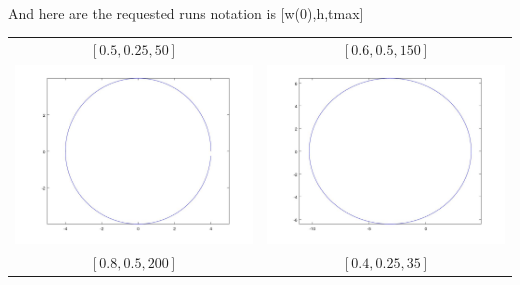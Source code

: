 \documentclass[12pt]{article}
\theoremstyle{homework}
\begin{document}
\begin{enumerate}[(a)]
\begin{tabular}{c c}
\end{tabular}\\
And here are the requested runs notation is [w(0),h,tmax]\\
\begin{tabular}{c c}
$[0.5,0.25,50]$ & $[0.6,0.5,150]$\\
\includegraphics[scale=.3]{../octave/f4.jpg} & \includegraphics[scale=.3]{../octave/f5.jpg}\\
$[0.8,0.5,200]$ & $[0.4,0.25,35]$\\

\end{tabular}
\end{enumerate}
\end{document}
